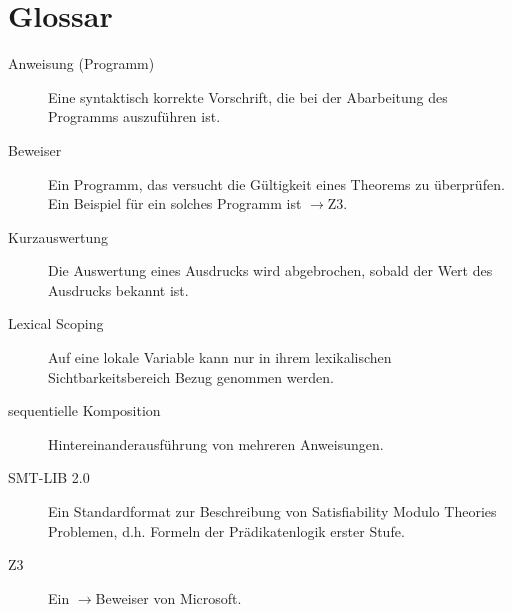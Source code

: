 \documentclass[a4paper,10pt]{article}
\begin{document}
\section{Glossar}
\begin{description}
\item[Anweisung (Programm)] Eine syntaktisch korrekte Vorschrift, die bei der Abarbeitung des Programms auszuf\"{u}hren ist.
\item[Beweiser] Ein Programm, das versucht die G\"{u}ltigkeit eines Theorems zu \"{u}berpr\"{u}fen. Ein Beispiel f\"{u}r ein solches Programm ist $\to$Z3.
\item[Kurzauswertung] Die Auswertung eines Ausdrucks wird abgebrochen, sobald der Wert des Ausdrucks bekannt ist.
\item[Lexical Scoping] Auf eine lokale Variable kann nur in ihrem lexikalischen Sichtbarkeitsbereich Bezug genommen werden.
\item[sequentielle Komposition] Hintereinanderausf\"{u}hrung von mehreren Anweisungen.
\item[SMT-LIB 2.0] Ein Standardformat zur Beschreibung von Satisfiability Modulo Theories Problemen, d.h. Formeln der Pr\"{a}dikatenlogik erster Stufe.
\item[Z3] Ein $\to$Beweiser von Microsoft.
\end{description}

\printindex[FA]
\end{document}
